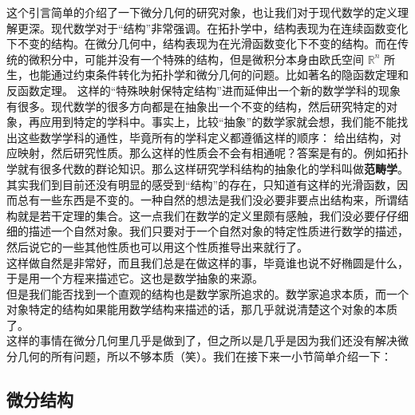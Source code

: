 \documentclass[a4paper,10pt]{article}
\begin{document}
这个引言简单的介绍了一下微分几何的研究对象，也让我们对于现代数学的定义理解更深。现代数学对于“结构”非常强调。在拓扑学中，结构表现为在连续函数变化下不变的结构。在微分几何中，结构表现为在光滑函数变化下不变的结构。而在传统的微积分中，可能并没有一个特殊的结构，但是微积分本身由欧氏空间 $ \mathbb{R}^n $ 所生，也能通过约束条件转化为拓扑学和微分几何的问题。比如著名的隐函数定理和反函数定理。
这样的“特殊映射保特定结构”进而延伸出一个新的数学学科的现象有很多。现代数学的很多方向都是在抽象出一个不变的结构，然后研究特定的对象，再应用到特定的学科中。事实上，比较“抽象”的数学家就会想，我们能不能找出这些数学学科的通性，毕竟所有的学科定义都遵循这样的顺序：
给出结构，对应映射，然后研究性质。那么这样的性质会不会有相通呢？答案是有的。例如拓扑学就有很多代数的群论知识。那么这样研究学科结构的抽象化的学科叫做\textbf{范畴学}。
\\
其实我们到目前还没有明显的感受到“结构”的存在，只知道有这样的光滑函数，因而总有一些东西是不变的。一种自然的想法是我们没必要非要点出结构来，所谓结构就是若干定理的集合。这一点我们在数学的定义里颇有感触，我们没必要仔仔细细的描述一个自然对象。我们只要对于一个自然对象的特定性质进行数学的描述，然后说它的一些其他性质也可以用这个性质推导出来就行了。\\

这样做自然是非常好，而且我们总是在做这样的事，毕竟谁也说不好椭圆是什么，于是用一个方程来描述它。这也是数学抽象的来源。\\
但是我们能否找到一个直观的结构也是数学家所追求的。数学家追求本质，而一个对象特定的结构如果能用数学结构来描述的话，那几乎就说清楚这个对象的本质了。\\
这样的事情在微分几何里几乎是做到了，但之所以是几乎是因为我们还没有解决微分几何的所有问题，所以不够本质（笑）。我们在接下来一小节简单介绍一下：
\subsection{微分结构}
\end{document}
